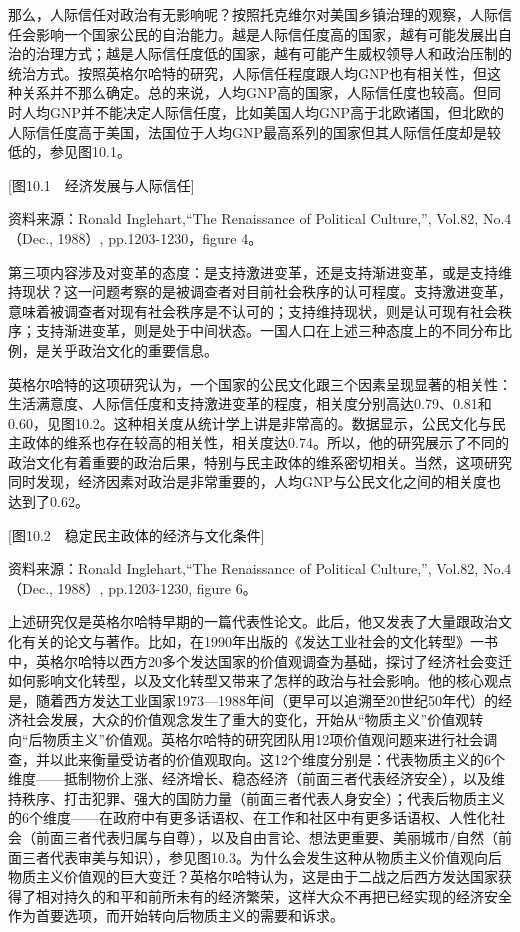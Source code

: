 那么，人际信任对政治有无影响呢？按照托克维尔对美国乡镇治理的观察，人际信任会影响一个国家公民的自治能力。越是人际信任度高的国家，越有可能发展出自治的治理方式；越是人际信任度低的国家，越有可能产生威权领导人和政治压制的统治方式。按照英格尔哈特的研究，人际信任程度跟人均GNP也有相关性，但这种关系并不那么确定。总的来说，人均GNP高的国家，人际信任度也较高。但同时人均GNP并不能决定人际信任度，比如美国人均GNP高于北欧诸国，但北欧的人际信任度高于美国，法国位于人均GNP最高系列的国家但其人际信任度却是较低的，参见图10.1。

[图10.1　经济发展与人际信任]

资料来源：Ronald Inglehart,“The Renaissance of Political Culture,”, Vol.82, No.4（Dec., 1988）, pp.1203-1230，figure 4。

第三项内容涉及对变革的态度：是支持激进变革，还是支持渐进变革，或是支持维持现状？这一问题考察的是被调查者对目前社会秩序的认可程度。支持激进变革，意味着被调查者对现有社会秩序是不认可的；支持维持现状，则是认可现有社会秩序；支持渐进变革，则是处于中间状态。一国人口在上述三种态度上的不同分布比例，是关乎政治文化的重要信息。

英格尔哈特的这项研究认为，一个国家的公民文化跟三个因素呈现显著的相关性：生活满意度、人际信任度和支持激进变革的程度，相关度分别高达0.79、0.81和0.60，见图10.2。这种相关度从统计学上讲是非常高的。数据显示，公民文化与民主政体的维系也存在较高的相关性，相关度达0.74。所以，他的研究展示了不同的政治文化有着重要的政治后果，特别与民主政体的维系密切相关。当然，这项研究同时发现，经济因素对政治是非常重要的，人均GNP与公民文化之间的相关度也达到了0.62。

[图10.2　稳定民主政体的经济与文化条件]

资料来源：Ronald Inglehart,“The Renaissance of Political Culture,”, Vol.82, No.4（Dec., 1988）, pp.1203-1230, figure 6。

上述研究仅是英格尔哈特早期的一篇代表性论文。此后，他又发表了大量跟政治文化有关的论文与著作。比如，在1990年出版的《发达工业社会的文化转型》一书中，英格尔哈特以西方20多个发达国家的价值观调查为基础，探讨了经济社会变迁如何影响文化转型，以及文化转型又带来了怎样的政治与社会影响。他的核心观点是，随着西方发达工业国家1973—1988年间（更早可以追溯至20世纪50年代）的经济社会发展，大众的价值观念发生了重大的变化，开始从“物质主义”价值观转向“后物质主义”价值观。英格尔哈特的研究团队用12项价值观问题来进行社会调查，并以此来衡量受访者的价值观取向。这12个维度分别是：代表物质主义的6个维度——抵制物价上涨、经济增长、稳态经济（前面三者代表经济安全），以及维持秩序、打击犯罪、强大的国防力量（前面三者代表人身安全）；代表后物质主义的6个维度——在政府中有更多话语权、在工作和社区中有更多话语权、人性化社会（前面三者代表归属与自尊），以及自由言论、想法更重要、美丽城市/自然（前面三者代表审美与知识），参见图10.3。为什么会发生这种从物质主义价值观向后物质主义价值观的巨大变迁？英格尔哈特认为，这是由于二战之后西方发达国家获得了相对持久的和平和前所未有的经济繁荣，这样大众不再把已经实现的经济安全作为首要选项，而开始转向后物质主义的需要和诉求。


